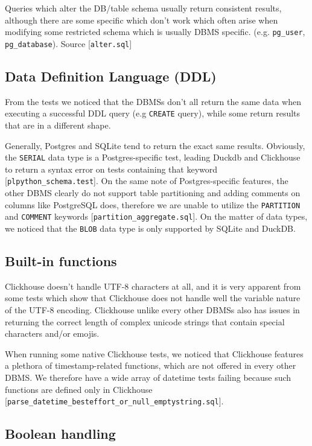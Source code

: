 \documentclass[acmsmall,nonacm]{acmart}
\begin{document}
Queries which alter the DB/table schema usually return consistent results, although there are some specific which don't work which often arise when modifying some restricted schema which is usually DBMS specific. (e.g. \texttt{pg\_user}, \texttt{pg\_database}). Source [\texttt{alter.sql}]


\subsection{Data Definition Language (DDL)}
From the tests we noticed that the DBMSs don't all return the same data when executing a successful DDL query (e.g \texttt{CREATE} query), while some return results that are in a different shape.

Generally, Postgres and SQLite tend to return the exact same results. Obviously, the \texttt{SERIAL} data type is a Postgres-specific test, leading Duckdb and Clickhouse to return a syntax error on tests containing that keyword [\texttt{plpython\_schema.test}]. On the same note of Postgres-specific features, the other DBMS clearly do not support table partitioning and adding comments on columns like PostgreSQL does, therefore we are unable to utilize the \texttt{PARTITION} and \texttt{COMMENT} keywords [\texttt{partition\_aggregate.sql}]. On the matter of data types, we noticed that the \texttt{BLOB} data type is only supported by SQLite and DuckDB.


\subsection{Built-in functions}
Clickhouse doesn't handle UTF-8 characters at all, and it is very apparent from some tests which show that Clickhouse does not handle well the variable nature of the UTF-8 encoding. Clickhouse unlike every other DBMSs also has issues in returning the correct length of complex unicode strings that contain special characters and/or emojis.

When running some native Clickhouse tests, we noticed that Clickhouse features a plethora of timestamp-related functions, which are not offered in every other DBMS. We therefore have a wide array of datetime tests failing because such functions are defined only in Clickhouse [\texttt{parse\_datetime\_besteffort\_or\_null\_emptystring.sql}].


\subsection{Boolean handling}
\end{document}
